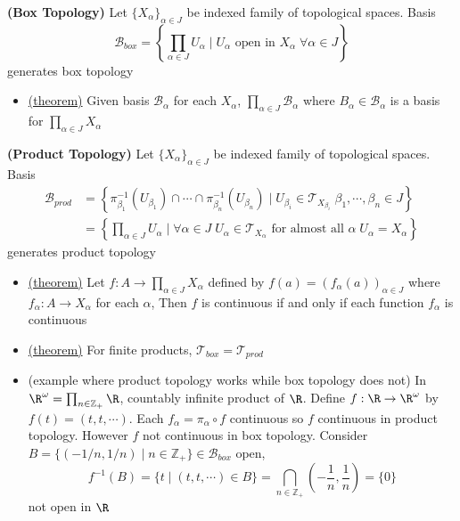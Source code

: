 \documentclass[10.5pt]{article}
\newcommand{\Z}{\mathbb{Z}}
\newcommand{\calB}{\mathcal{B}}
\newcommand{\calT}{\mathcal{T}}
\begin{document}
\begin{defn*}
    \textbf{(Box Topology)} Let $\{X_{\alpha}\}_{\alpha\in J}$ be indexed family of topological spaces. Basis
    \[
        \calB_{box} = 
        \left\{
            \prod_{\alpha\in J} U_{\alpha} \mid U_{\alpha} \text{ open in } X_{\alpha} \; \forall \alpha \in J
        \right\}    
    \]
    generates box topology
    \begin{itemize}
        \item \underline{(theorem)} Given basis $\calB_{\alpha}$ for each $X_{\alpha}$, $\textstyle \prod_{\alpha\in J} \calB_{\alpha}$ where $\textstyle B_{\alpha}\in \calB_{\alpha}$ is a basis for $\textstyle\prod_{\alpha\in J} X_{\alpha}$
    \end{itemize}
\end{defn*}

\begin{defn*}
    \textbf{(Product Topology)} Let $\{X_{\alpha}\}_{\alpha\in J}$ be indexed family of topological spaces. Basis
    \begin{align*}
        \calB_{prod}
        &= \left\{
            \pi_{\beta_1}^{-1}(U_{\beta_1}) \cap \cdots \cap \pi_{\beta_n}^{-1}(U_{\beta_n}) \mid U_{\beta_i} \in \calT_{X_{\beta_i}} \; \beta_1 ,\cdots, \beta_n \in J
        \right\} \\
        &= \left\{
            \prod_{\alpha\in J} U_{\alpha} \mid \forall \alpha \in J \; U_{\alpha} \in \calT_{X_{\alpha}} \text{  for almost all } \alpha \; U_{\alpha} = X_{\alpha}
        \right\}
    \end{align*}
    generates product topology
    \begin{itemize}
        \item \underline{(theorem)} Let $\textstyle f:A\to \prod_{\alpha\in J} X_{\alpha}$ defined by $f(a) = (f_{\alpha}(a))_{\alpha\in J}$ where $f_{\alpha}: A\to X_{\alpha}$ for each $\alpha$, Then $f$ is continuous if and only if each function $f_{\alpha}$ is continuous
        \item \underline{(theorem)} For finite products, $\calT_{box} = \calT_{prod}$
        \item (example where product topology works while box topology does not) In $\R^{\omega} = \textstyle \prod_{n\in \Z_+} \R$, countably infinite product of $\R$. Define $f:\R\to \R^{\omega}$ by $f(t) = (t,t,\cdots)$. Each $f_{\alpha} = \pi_{\alpha} \circ f$ continuous so $f$ continuous in product topology. However $f$ not continuous in box topology. Consider $B = \{ (-1/n, 1/n) \mid n\in \Z_+ \} \in \calB_{box}$ open,
        \[
            f^{-1}(B) 
            = \{ t \mid (t,t,\cdots) \in B \}
            = \bigcap_{n\in \Z_+} (-\frac{1}{n}, \frac{1}{n})
            = \{0\}
        \]
        not open in $\R$
    \end{itemize}
\end{defn*}
\end{document}
